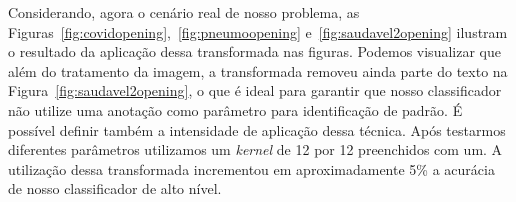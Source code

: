 \documentclass[
12pt,        %
oneside,     %
a4paper,     %
english,       %
brazil        %
%
%
]{ppgca}
\begin{document}
Considerando, agora o cenário real de nosso problema, as Figuras~\ref{fig:covidopening},~\ref{fig:pneumoopening} e~\ref{fig:saudavel2opening} ilustram o resultado da aplicação dessa transformada nas figuras. Podemos visualizar que além do tratamento da imagem, a transformada removeu ainda parte do texto na Figura~\ref{fig:saudavel2opening}, o que é ideal para garantir que nosso classificador não utilize uma anotação como parâmetro para identificação de padrão. É possível definir também a intensidade de aplicação dessa técnica. Após testarmos diferentes parâmetros utilizamos um \textit{kernel} de 12 por 12 preenchidos com um. A utilização dessa transformada incrementou em aproximadamente 5\% a acurácia de nosso classificador de alto nível.
\end{document}

